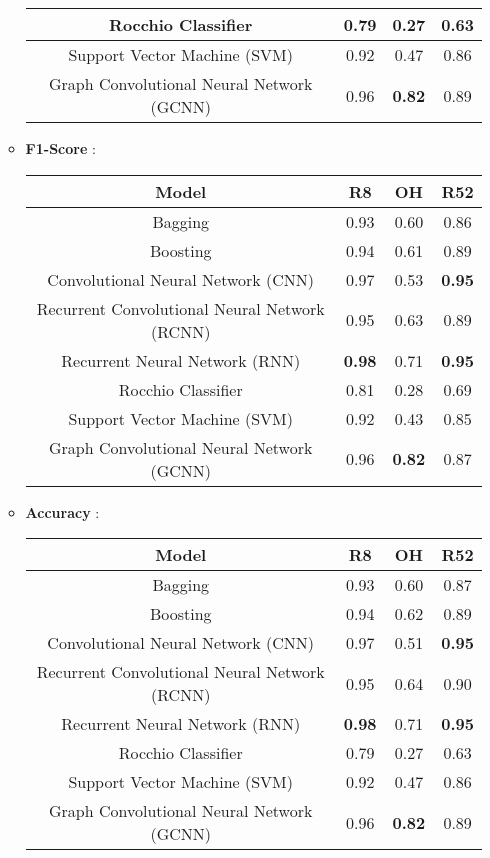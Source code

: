 \begin{itemize}
\begin{itemize}
\begin{tabular}{|c|c|c|c|}
                Rocchio Classifier & 0.79 & 0.27 &  0.63\\\hline
                Support Vector Machine (SVM) & 0.92 & 0.47 &  0.86\\\hline
                Graph Convolutional Neural Network (GCNN) & 0.96 & \textbf{0.82} & 0.89\\\hline
            \end{tabular}
        \item \textbf{F1-Score} :
            \newline
            \begin{tabular}{|c|c|c|c|}\hline
                 \textbf{Model} & \textbf{R8} & \textbf{OH} & \textbf{R52} \\\hline
                Bagging & 0.93 & 0.60 & 0.86 \\\hline
                Boosting & 0.94 & 0.61 &  0.89\\\hline
                Convolutional Neural Network (CNN) & 0.97 & 0.53 &  \textbf{0.95}\\\hline
                Recurrent Convolutional Neural Network (RCNN) & 0.95 & 0.63 &  0.89\\\hline
                Recurrent Neural Network (RNN) & \textbf{0.98} & 0.71 & \textbf{0.95} \\\hline
                Rocchio Classifier & 0.81 & 0.28 & 0.69 \\\hline
                Support Vector Machine (SVM) & 0.92 & 0.43 &  0.85\\\hline
                Graph Convolutional Neural Network (GCNN) & 0.96 & \textbf{0.82} & 0.87\\\hline
            \end{tabular}
        
        \item \textbf{Accuracy} :
            \newline
            \begin{tabular}{|c|c|c|c|}\hline
                 \textbf{Model} & \textbf{R8} & \textbf{OH} & \textbf{R52} \\\hline
                Bagging & 0.93 & 0.60 & 0.87 \\\hline
                Boosting & 0.94 & 0.62 & 0.89 \\\hline
                Convolutional Neural Network (CNN) & 0.97 & 0.51 & \textbf{0.95} \\\hline
                Recurrent Convolutional Neural Network (RCNN) & 0.95 & 0.64 &  0.90\\\hline
                Recurrent Neural Network (RNN) & \textbf{0.98} & 0.71 & \textbf{0.95}  \\\hline
                Rocchio Classifier & 0.79 & 0.27 &  0.63\\\hline
                Support Vector Machine (SVM) & 0.92 & 0.47 &  0.86\\\hline
                Graph Convolutional Neural Network (GCNN) & 0.96 & \textbf{0.82} & 0.89\\\hline
            \end{tabular}
    \end{itemize}
\end{itemize}